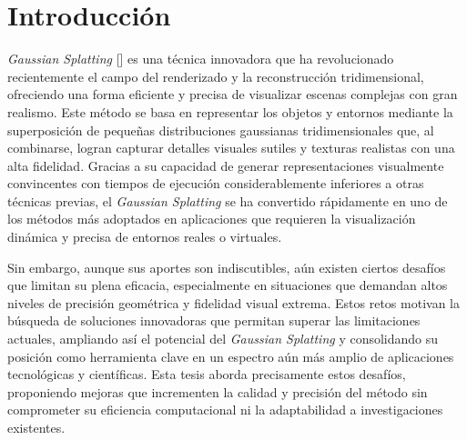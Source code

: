 \chapter*{Introducción}\label{chapter\:introduction}


\textit{Gaussian Splatting} [\cite{kerbl20233d}] es una técnica innovadora que ha revolucionado recientemente el campo del renderizado y la reconstrucción tridimensional, 
ofreciendo una forma eficiente y precisa de visualizar escenas complejas con gran realismo. 
Este método se basa en representar los objetos y entornos mediante la superposición de pequeñas distribuciones gaussianas tridimensionales que, 
al combinarse, logran capturar detalles visuales sutiles y texturas realistas con una alta fidelidad. 
Gracias a su capacidad de generar representaciones visualmente convincentes con tiempos de ejecución considerablemente inferiores a 
otras técnicas previas, el \textit{Gaussian Splatting} se ha convertido rápidamente en uno de los métodos más adoptados en aplicaciones 
que requieren la visualización dinámica y precisa de entornos reales o virtuales.

Sin embargo, aunque sus aportes son indiscutibles, aún existen ciertos desafíos que limitan su plena eficacia, especialmente en situaciones que 
demandan altos niveles de precisión geométrica y fidelidad visual extrema. Estos retos motivan la búsqueda de soluciones innovadoras que permitan 
superar las limitaciones actuales, ampliando así el potencial del \textit{Gaussian Splatting} y consolidando su posición como herramienta clave en 
un espectro aún más amplio de aplicaciones tecnológicas y científicas. Esta tesis aborda precisamente estos desafíos, proponiendo mejoras que 
incrementen la calidad y precisión del método sin comprometer su eficiencia computacional ni la adaptabilidad a investigaciones existentes.

